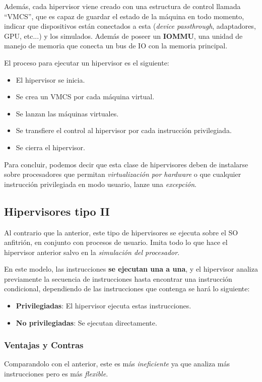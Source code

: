 \par  Además, cada hipervisor viene creado con una estructura de control llamada ``VMCS'', que es capaz de guardar el estado de la máquina en todo momento, indicar que dispositivos están conectados a esta (\textit{device passthrough}, adaptadores, GPU, etc...) y los simulados. Además de poseer un \textbf{IOMMU}, una unidad de manejo de memoria que conecta un bus de IO con la memoria principal.
\par  El proceso para ejecutar un hipervisor es el siguiente:
\begin{itemize}
        \item El hipervisor se inicia.
        \item Se crea un VMCS por cada máquina virtual.
        \item Se lanzan las máquinas virtuales.
        \item Se transfiere el control al hipervisor por cada instrucción privilegiada.
        \item Se cierra el hipervisor.
\end{itemize}
Para concluir, podemos decir que esta clase de hipervisores deben de instalarse sobre procesadores que permitan \textit{virtualización por hardware} o que cualquier instrucción privilegiada en modo usuario, lanze una \textit{excepción}.
\subsection{Hipervisores tipo II}
Al contrario que la anterior, este tipo de hipervisores se ejecuta sobre el SO anfitrión, en conjunto con procesos de usuario. Imita todo lo que hace el hipervisor anterior salvo en la \textit{simulación del procesador}.
\par En este modelo, las instrucciones \textbf{se ejecutan una a una}, y el hipervisor analiza previamente la secuencia de instrucciones hasta encontrar una instrucción condicional, dependiendo de las instrucciones que contenga se hará lo siguiente:
\begin{itemize}
        \item \textbf{Privilegiadas}: El hipervisor ejecuta estas instrucciones.
        \item \textbf{No privilegiadas}: Se ejecutan directamente.
\end{itemize}
\subsubsection{Ventajas y Contras}
Comparandolo con el anterior, este es más \textit{ineficiente} ya que analiza más instrucciones pero es más \textit{flexible}.
